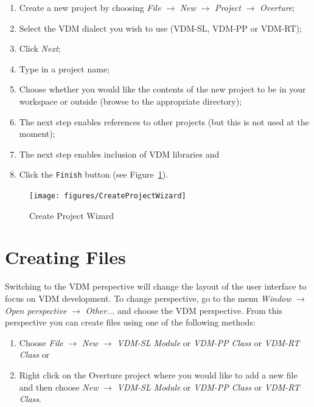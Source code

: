 \documentclass{overturerepchap}
\begin{document}
\begin{enumerate}
	\item Create a new project by choosing \emph{File}
          $\rightarrow$ \emph{New} $\rightarrow$ \emph{Project}
          $\rightarrow$ \emph{Overture}; 
	\item Select the VDM dialect you wish to use (VDM-SL, VDM-PP
          or VDM-RT);
	\item Click \emph{Next};
         \item Type in a project name;
	\item Choose whether you would like the contents of the new
          project to be in your workspace or outside
          (browse to the appropriate directory); 
\item The next step enables references to other projects (but this is not used at the moment);
\item The next step enables inclusion of VDM libraries and
    \item Click	the \texttt{Finish} button (see Figure~\ref{fig:CreateProjectWizard}).
\end{enumerate}

\begin{figure}[!htb]
	\begin{center}
	  \texttt{[image: figures/CreateProjectWizard]}
	  \caption[Create Project Wizard]{Create Project Wizard}
	  \label{fig:CreateProjectWizard}
	\end{center}
\end{figure}


\section{Creating Files}

Switching to the VDM perspective will change the layout of the user
interface to focus on VDM development. To change perspective, go to the menu
\emph{Window} $\rightarrow$ \emph{Open perspective} $\rightarrow$
\emph{Other...} and choose the VDM perspective.
From this perspective you can create files
using one of the following methods:

\begin{enumerate}
  \item Choose \emph{File} $\rightarrow$ \emph{New} $\rightarrow$
    \emph{VDM-SL Module} or
    \emph{VDM-PP Class} or
    \emph{VDM-RT Class} or
  \item Right click on the Overture project where you would like to
    add a new file and then choose \emph{New} $\rightarrow$
    \emph{VDM-SL Module} or \emph{VDM-PP Class} or \emph{VDM-RT Class}.
\end{enumerate}
\end{document}
